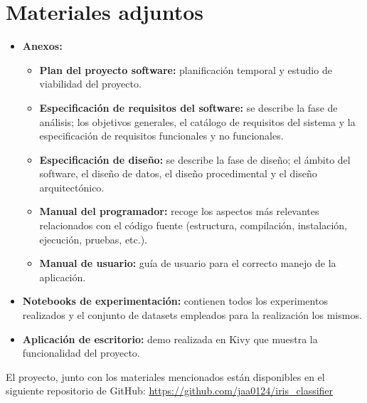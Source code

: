 \section{Materiales adjuntos}\label{materiales-adjuntos}
\begin{itemize}	
	\item \textbf{Anexos:}
	\begin{itemize}
	\tightlist
	\item
  		\textbf{Plan del proyecto software:} planificación temporal y estudio
  		de viabilidad del proyecto.
	\item
  		\textbf{Especificación de requisitos del software:} se describe la
  		fase de análisis; los objetivos generales, el catálogo de requisitos
  		del sistema y la especificación de requisitos funcionales y no
  		funcionales.
	\item
  		\textbf{Especificación de diseño:} se describe la fase de diseño; el
  		ámbito del software, el diseño de datos, el diseño procedimental y el
  		diseño arquitectónico.
	\item
  		\textbf{Manual del programador:} recoge los aspectos más relevantes
  		relacionados con el código fuente (estructura, compilación,
  		instalación, ejecución, pruebas, etc.).
	\item
  		\textbf{Manual de usuario:} guía de usuario para el correcto manejo 			de la aplicación.
	\end{itemize}
	
	\item \textbf{Notebooks de experimentación:} contienen todos los experimentos realizados y el conjunto de datasets empleados para la realización los mismos.
	\item \textbf{Aplicación de escritorio:} demo realizada en Kivy que muestra la funcionalidad del proyecto.
\end{itemize}

El proyecto, junto con los materiales mencionados están disponibles en el siguiente repositorio de GitHub: \url{https://github.com/jaa0124/iris_classifier}
